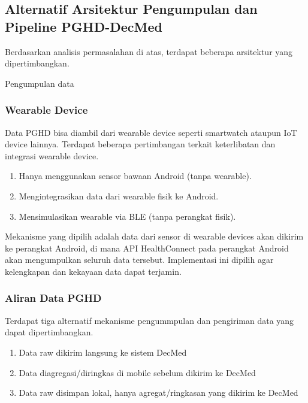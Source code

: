 \subsection{Alternatif Arsitektur Pengumpulan dan Pipeline PGHD-DecMed}\label{alternatif-arsitektur-pipeline-pghd}

Berdasarkan analisis permasalahan di atas, terdapat beberapa arsitektur yang dipertimbangkan.

Pengumpulan data 

\subsubsection{Wearable Device}

Data PGHD bisa diambil dari wearable device seperti smartwatch ataupun IoT device lainnya.
Terdapat beberapa pertimbangan terkait keterlibatan dan integrasi wearable device.

\begin{enumerate}
    \item Hanya menggunakan sensor bawaan Android (tanpa wearable).
    \item Mengintegrasikan data dari wearable fisik ke Android.
    \item Mensimulasikan wearable via BLE (tanpa perangkat fisik).
\end{enumerate}

Mekanisme yang dipilih adalah data dari sensor di wearable devices akan dikirim ke perangkat Android, di mana API HealthConnect pada perangkat Android akan mengumpulkan seluruh data tersebut.
Implementasi ini dipilih agar kelengkapan dan kekayaan data dapat terjamin. %

\subsubsection{Aliran Data PGHD}

Terdapat tiga alternatif mekanisme pengummpulan dan pengiriman data yang dapat dipertimbangkan.

\begin{enumerate}
    \item Data raw dikirim langsung ke sistem DecMed
    \item Data diagregasi/diringkas di mobile sebelum dikirim ke DecMed
    \item Data raw disimpan lokal, hanya agregat/ringkasan yang dikirim ke DecMed
\end{enumerate}

